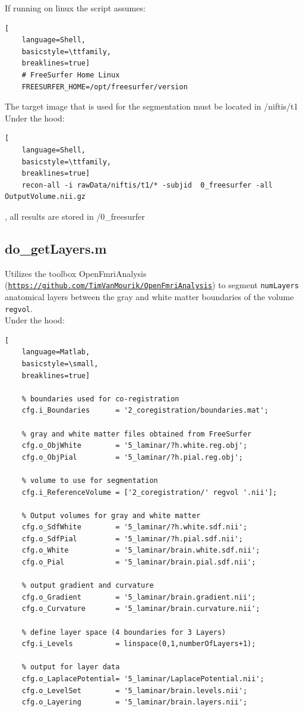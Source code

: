 \documentclass[12pt,a4paper]{scrartcl}
\begin{document}
\noindent If running on linux the script assumes:\\
\begin{lstlisting}[
    language=Shell,
    basicstyle=\ttfamily,
    breaklines=true]
    # FreeSurfer Home Linux
    FREESURFER_HOME=/opt/freesurfer/version
\end{lstlisting}

\noindent The target image that is used for the segmentation must be located in /niftis/t1\\

\noindent Under the hood:
\begin{lstlisting}[
    language=Shell,
    basicstyle=\ttfamily,
    breaklines=true]
    recon-all -i rawData/niftis/t1/* -subjid  0_freesurfer -all OutputVolume.nii.gz
\end{lstlisting}
, all results are stored in /0\_freesurfer\\

\subsection{do\_getLayers.m}
\label{m:getLyr}
Utilizes the toolbox OpenFmriAnalysis (\href{https://github.com/TimVanMourik/OpenFmriAnalysis}{\nolinkurl{https://github.com/TimVanMourik/OpenFmriAnalysis}}) to segment \texttt{numLayers} anatomical layers between the gray and white matter boundaries of the volume \texttt{regvol}.\\

\noindent Under the hood:
\begin{lstlisting}[
    language=Matlab,
    basicstyle=\small,
    breaklines=true]

    % boundaries used for co-registration
    cfg.i_Boundaries      = '2_coregistration/boundaries.mat';

    % gray and white matter files obtained from FreeSurfer
    cfg.o_ObjWhite        = '5_laminar/?h.white.reg.obj';
    cfg.o_ObjPial         = '5_laminar/?h.pial.reg.obj';

    % volume to use for segmentation
    cfg.i_ReferenceVolume = ['2_coregistration/' regvol '.nii'];

    % Output volumes for gray and white matter
    cfg.o_SdfWhite        = '5_laminar/?h.white.sdf.nii';
    cfg.o_SdfPial         = '5_laminar/?h.pial.sdf.nii';
    cfg.o_White           = '5_laminar/brain.white.sdf.nii';
    cfg.o_Pial            = '5_laminar/brain.pial.sdf.nii';

    % output gradient and curvature
    cfg.o_Gradient        = '5_laminar/brain.gradient.nii';
    cfg.o_Curvature       = '5_laminar/brain.curvature.nii';

    % define layer space (4 boundaries for 3 Layers)
    cfg.i_Levels          = linspace(0,1,numberOfLayers+1);

    % output for layer data
    cfg.o_LaplacePotential= '5_laminar/LaplacePotential.nii';
    cfg.o_LevelSet        = '5_laminar/brain.levels.nii';
    cfg.o_Layering        = '5_laminar/brain.layers.nii';
\end{lstlisting}
\end{document}
